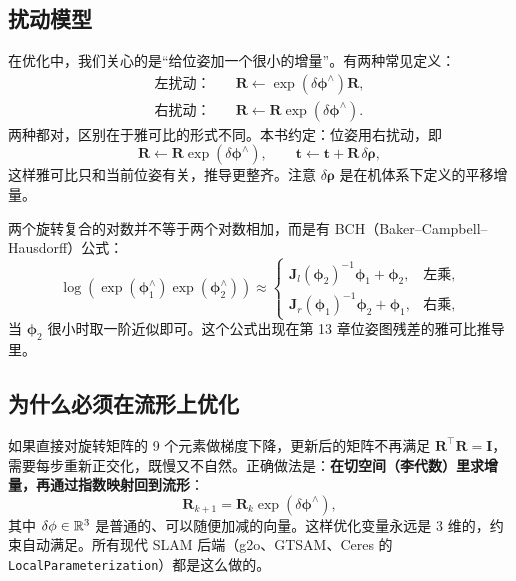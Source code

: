 \subsection{扰动模型}

在优化中，我们关心的是“给位姿加一个很小的增量”。有两种常见定义：
\begin{align}
\text{左扰动：}&\quad \bm{R}\leftarrow\exp(\delta\bm{\phi}^{\wedge})\bm{R},\\
\text{右扰动：}&\quad \bm{R}\leftarrow\bm{R}\exp(\delta\bm{\phi}^{\wedge}).
\end{align}
两种都对，区别在于雅可比的形式不同。本书约定：位姿用右扰动，即
\begin{equation}
\bm{R}\leftarrow\bm{R}\exp(\delta\bm{\phi}^{\wedge}),\qquad \bm{t}\leftarrow\bm{t}+\bm{R}\,\delta\bm{\rho},
\end{equation}
这样雅可比只和当前位姿有关，推导更整齐。注意 $\delta\bm{\rho}$ 是在机体系下定义的平移增量。

两个旋转复合的对数并不等于两个对数相加，而是有 BCH（Baker--Campbell--Hausdorff）公式：
\begin{equation}
\log\left(\exp(\bm{\phi}_1^{\wedge})\exp(\bm{\phi}_2^{\wedge})\right)
\approx
\begin{cases}
\bm{J}_l(\bm{\phi}_2)^{-1}\bm{\phi}_1+\bm{\phi}_2, & \text{左乘},\\
\bm{J}_r(\bm{\phi}_1)^{-1}\bm{\phi}_2+\bm{\phi}_1, & \text{右乘},
\end{cases}
\end{equation}
当 $\bm{\phi}_2$ 很小时取一阶近似即可。这个公式出现在第 13 章位姿图残差的雅可比推导里。

\subsection{为什么必须在流形上优化}

如果直接对旋转矩阵的 9 个元素做梯度下降，更新后的矩阵不再满足 $\bm{R}^{\top}\bm{R}=\bm{I}$，需要每步重新正交化，既慢又不自然。正确做法是：\textbf{在切空间（李代数）里求增量，再通过指数映射回到流形}：
\begin{equation}
\bm{R}_{k+1}=\bm{R}_k\exp(\delta\bm{\phi}^{\wedge}),
\end{equation}
其中 $\delta\phi\in\mathbb{R}^{3}$ 是普通的、可以随便加减的向量。这样优化变量永远是 3 维的，约束自动满足。所有现代 SLAM 后端（g2o、GTSAM、Ceres 的 \lstinline{LocalParameterization}）都是这么做的。

